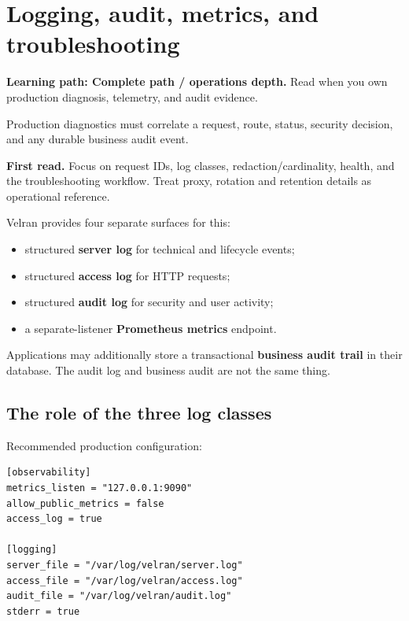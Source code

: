 \chapter{Logging, audit, metrics, and troubleshooting}

\noindent\textbf{Learning path: Complete path / operations depth.} Read when you own production diagnosis, telemetry, and audit evidence.\par\medskip


Production diagnostics must correlate a request, route, status, security decision, and any durable business audit event.

\noindent\textbf{First read.} Focus on request IDs, log classes, redaction/cardinality, health, and the troubleshooting workflow. Treat proxy, rotation and retention details as operational reference.\par\medskip

Velran provides four separate surfaces for this:

\begin{itemize}
  \item structured \textbf{server log} for technical and lifecycle events;
  \item structured \textbf{access log} for HTTP requests;
  \item structured \textbf{audit log} for security and user activity;
  \item a separate-listener \textbf{Prometheus metrics} endpoint.
\end{itemize}

Applications may additionally store a transactional \textbf{business audit trail} in their database. The audit log and business audit are not the same thing.

\section{The role of the three log classes}

Recommended production configuration:

\begin{lstlisting}
[observability]
metrics_listen = "127.0.0.1:9090"
allow_public_metrics = false
access_log = true

[logging]
server_file = "/var/log/velran/server.log"
access_file = "/var/log/velran/access.log"
audit_file = "/var/log/velran/audit.log"
stderr = true
\end{lstlisting}

